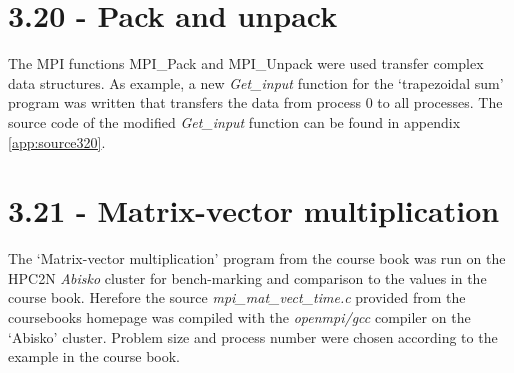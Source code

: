 \documentclass[a4paper,11pt,twoside]{article}
\begin{document}
\section{3.20 - Pack and unpack}
The MPI functions MPI\_Pack and MPI\_Unpack were used transfer complex data structures. As example, a new \textit{Get\_input} function for the `trapezoidal sum' program was written that transfers the data from process 0 to all processes. The source code of the modified \textit{Get\_input} function can be found in appendix \ref{app:source320}.

\section{3.21 - Matrix-vector multiplication}
The `Matrix-vector multiplication' program from the course book was run on the HPC2N \textit{Abisko} cluster for bench-marking and comparison to the values in the course book. Herefore the source \textit{mpi\_mat\_vect\_time.c} provided from the coursebooks homepage was compiled with the \textit{openmpi/gcc} compiler on the `Abisko' cluster. Problem size and process number were chosen according to the example in the course book.
\end{document}
